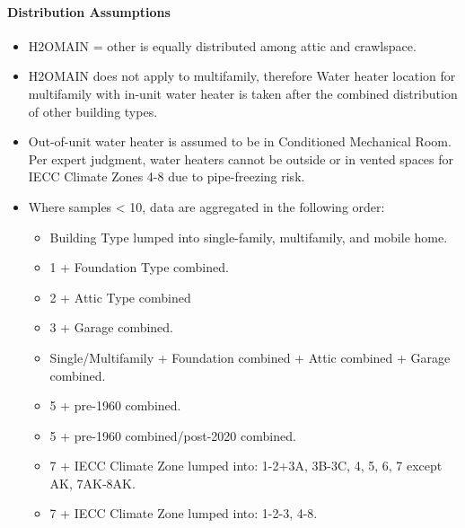 \paragraph{Distribution Assumptions}
% 
\begin{itemize}
\item
  H2OMAIN = other is equally distributed among attic and crawlspace.
\item
  H2OMAIN does not apply to multifamily, therefore Water heater
  location for multifamily with in-unit water heater is taken after the
  combined distribution of other building types.
\item
  Out-of-unit water heater is assumed to be in Conditioned Mechanical
  Room. Per expert judgment, water heaters cannot be outside or in
  vented spaces for IECC Climate Zones 4-8 due to pipe-freezing risk.
\item
  Where samples \textless{} 10, data are aggregated in the following
  order:
  \begin{itemize}
\item
  Building Type lumped into single-family, multifamily, and mobile
  home.
\item
  1 + Foundation Type combined. 
\item 
2 + Attic Type combined
\item
  3 + Garage combined.
\item
  Single/Multifamily + Foundation combined + Attic combined +
  Garage combined.
\item
  5 + pre-1960 combined.
\item
  5 + pre-1960 combined/post-2020 combined.
\item
  7 + IECC Climate Zone lumped into: 1-2+3A, 3B-3C, 4, 5, 6, 7 except
  AK, 7AK-8AK.
\item
  7 + IECC Climate Zone lumped into: 1-2-3, 4-8.
\end{itemize}
\end{itemize}
